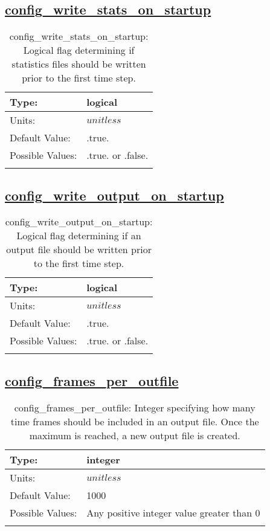 \subsection[config\_write\_stats\_on\_startup]{\hyperref[sec:nm_tab_io]{config\_write\_stats\_on\_startup}}
\label{subsec:nm_sec_config_write_stats_on_startup}
\begin{center}
\begin{longtable}{| p{2.0in} | p{4.0in} |}
    \hline
    Type: & logical \\
    \hline
    Units: & $unitless$ \\
    \hline
    Default Value: & .true. \\
    \hline
    Possible Values: & .true. or .false. \\
    \hline
    \caption{config\_write\_stats\_on\_startup: Logical flag determining if statistics files should be written prior to the first time step.}
\end{longtable}
\end{center}
\subsection[config\_write\_output\_on\_startup]{\hyperref[sec:nm_tab_io]{config\_write\_output\_on\_startup}}
\label{subsec:nm_sec_config_write_output_on_startup}
\begin{center}
\begin{longtable}{| p{2.0in} | p{4.0in} |}
    \hline
    Type: & logical \\
    \hline
    Units: & $unitless$ \\
    \hline
    Default Value: & .true. \\
    \hline
    Possible Values: & .true. or .false. \\
    \hline
    \caption{config\_write\_output\_on\_startup: Logical flag determining if an output file should be written prior to the first time step.}
\end{longtable}
\end{center}
\subsection[config\_frames\_per\_outfile]{\hyperref[sec:nm_tab_io]{config\_frames\_per\_outfile}}
\label{subsec:nm_sec_config_frames_per_outfile}
\begin{center}
\begin{longtable}{| p{2.0in} | p{4.0in} |}
    \hline
    Type: & integer \\
    \hline
    Units: & $unitless$ \\
    \hline
    Default Value: & 1000 \\
    \hline
    Possible Values: & Any positive integer value greater than 0 \\
    \hline
    \caption{config\_frames\_per\_outfile: Integer specifying how many time frames should be included in an output file. Once the maximum is reached, a new output file is created.}
\end{longtable}
\end{center}
